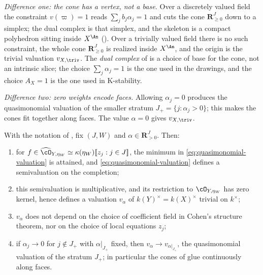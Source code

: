 \emph{Difference one: the cone has a vertex, not a base.}  Over a discretely
valued field the constraint $v(\varpi)=1$ reads
$\sum_jb_j\alpha_j=1$ and cuts the cone $\mathbf R_{\geq0}^J$ down to a
simplex; the dual complex is that simplex, and the skeleton is a compact
polyhedron sitting inside $X^{\An}$
().  Over a trivially valued field there is no
such constraint, the whole cone $\mathbf R_{\geq0}^J$ is realized inside
$X^{\An}$, and the origin is the trivial valuation $v_{X,\triv}$.  The
\emph{dual complex} of  is a choice of base for the
cone, not an intrinsic slice; the choice $\sum_j\alpha_j=1$ is the one used
in the drawings, and the choice $A_X=1$ is the one used in K-stability.

\emph{Difference two: zero weights encode faces.}
Allowing $\alpha_j=0$ produces the quasimonomial
valuation of the smaller stratum $J_+=\{j:\alpha_j>0\}$; this makes the
cones fit together along faces.  The value $\alpha=0$ gives
$v_{X,\triv}$.

\begin{proposition}
\label{prop:ch32-qm-well-defined}
With the notation of , fix $(J,W)$ and
$\alpha\in\mathbf R_{>0}^J$.  Then:
\begin{enumerate}
\item\label{itm:ch32-qm:min}
for $f\in\widehat{\cO}_{Y,\eta_W}\simeq\kappa(\eta_W)[\![z_j:j\in J]\!]$,
the minimum in \eqref{eq:quasimonomial-valuation} is attained, and
\eqref{eq:quasimonomial-valuation} defines a semivaluation on the completion;
\item\label{itm:ch32-qm:mult}
this semivaluation is multiplicative, and its restriction to
$\cO_{Y,\eta_W}$ has zero kernel, hence defines a valuation
$v_\alpha$ of $k(Y)^\times=k(X)^\times$ trivial on $k^\times$;
\item\label{itm:ch32-qm:indep}
$v_\alpha$ does not depend on the choice of coefficient field in
Cohen's structure theorem, nor on the choice of local equations $z_j$;
\item\label{itm:ch32-qm:face}
if $\alpha_j\to0$ for $j\notin J_+$ with $\alpha|_{J_+}$ fixed, then
$v_\alpha\to v_{\alpha|_{J_+}}$, the quasimonomial valuation of the
stratum $J_+$; in particular the cones of  glue
continuously along faces.
\end{enumerate}
\end{proposition}

